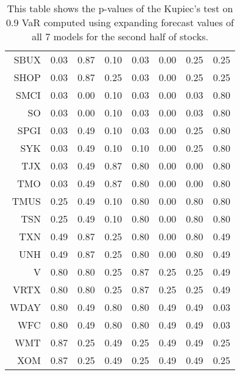 \begin{table}[ht]
\begin{tabular}{rrrrrrrr}
  SBUX & 0.03 & 0.87 & 0.10 & 0.03 & 0.00 & 0.25 & 0.25 \\ 
  SHOP & 0.03 & 0.87 & 0.25 & 0.03 & 0.00 & 0.25 & 0.25 \\ 
  SMCI & 0.03 & 0.00 & 0.10 & 0.03 & 0.00 & 0.03 & 0.80 \\ 
  SO & 0.03 & 0.00 & 0.10 & 0.03 & 0.00 & 0.03 & 0.80 \\ 
  SPGI & 0.03 & 0.49 & 0.10 & 0.03 & 0.00 & 0.25 & 0.80 \\ 
  SYK & 0.03 & 0.49 & 0.10 & 0.10 & 0.00 & 0.25 & 0.80 \\ 
  TJX & 0.03 & 0.49 & 0.87 & 0.80 & 0.00 & 0.00 & 0.80 \\ 
  TMO & 0.03 & 0.49 & 0.87 & 0.80 & 0.00 & 0.00 & 0.80 \\ 
  TMUS & 0.25 & 0.49 & 0.10 & 0.80 & 0.00 & 0.80 & 0.80 \\ 
  TSN & 0.25 & 0.49 & 0.10 & 0.80 & 0.00 & 0.80 & 0.80 \\ 
  TXN & 0.49 & 0.87 & 0.25 & 0.80 & 0.00 & 0.80 & 0.49 \\ 
  UNH & 0.49 & 0.87 & 0.25 & 0.80 & 0.00 & 0.80 & 0.49 \\ 
  V & 0.80 & 0.80 & 0.25 & 0.87 & 0.25 & 0.25 & 0.49 \\ 
  VRTX & 0.80 & 0.80 & 0.25 & 0.87 & 0.25 & 0.25 & 0.49 \\ 
  WDAY & 0.80 & 0.49 & 0.80 & 0.80 & 0.49 & 0.49 & 0.03 \\ 
  WFC & 0.80 & 0.49 & 0.80 & 0.80 & 0.49 & 0.49 & 0.03 \\ 
  WMT & 0.87 & 0.25 & 0.49 & 0.25 & 0.49 & 0.49 & 0.25 \\ 
  XOM & 0.87 & 0.25 & 0.49 & 0.25 & 0.49 & 0.49 & 0.25 \\ 
   \hline
\end{tabular}
\caption[Kupiec's test p-values, alpha =0.9 (2)]{This table shows the p-values of the Kupiec's test on 0.9 VaR computed using expanding forecast values of all 7 models for the second half of stocks.} 
\label{Table:Kupiec_test_expanding_0.9_2}
\end{table}
